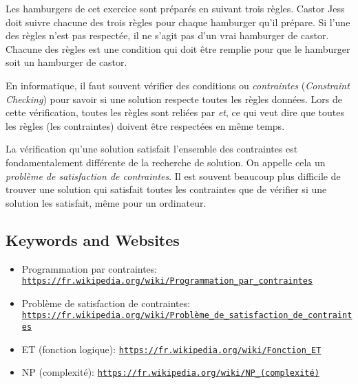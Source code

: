 \documentclass[a4paper,11pt]{report}
\newcommand{\BrochureUrlText}[1]{\texttt{#1}}
\begin{document}
Les hamburgers de cet exercice sont préparés en suivant trois règles. Castor Jess doit suivre chacune des trois règles pour chaque hamburger qu’il prépare. Si l’une des règles n’est pas respectée, il ne s’agit pas d’un vrai hamburger de castor. Chacune des règles est une condition qui doit être remplie pour que le hamburger soit un hamburger de castor.

En informatique, il faut souvent vérifier des conditions ou \emph{contraintes} (\emph{Constraint Checking}) pour savoir si une solution respecte toutes les règles données. Lors de cette vérification, toutes les règles sont reliées par \emph{et}, ce qui veut dire que toutes les règles (les contraintes) doivent être respectées en même temps.

La vérification qu’une solution satisfait l’ensemble des contraintes est fondamentalement différente de la recherche de solution. On appelle cela un \emph{problème de satisfaction de contraintes}. Il est souvent beaucoup plus difficile de trouver une solution qui satisfait toutes les contraintes que de vérifier si une solution les satisfait, même pour un ordinateur.

{\raggedright

\subsection*{Keywords and Websites}

\begin{itemize}
  \item Programmation par contraintes: \href{https://fr.wikipedia.org/wiki/Programmation_par_contraintes}{\BrochureUrlText{https://fr.wikipedia.org/wiki/Programmation\_par\_contraintes}}
  \item Problème de satisfaction de contraintes: \href{https://fr.wikipedia.org/wiki/Probl\%C3\%A8me_de_satisfaction_de_contraintes}{\BrochureUrlText{https://fr.wikipedia.org/wiki/Problème\_de\_satisfaction\_de\_contraintes}}
  \item ET (fonction logique): \href{https://fr.wikipedia.org/wiki/Fonction_ET}{\BrochureUrlText{https://fr.wikipedia.org/wiki/Fonction\_ET}}
  \item NP (complexité): \href{https://fr.wikipedia.org/wiki/NP_(complexit\%C3\%A9)}{\BrochureUrlText{https://fr.wikipedia.org/wiki/NP\_(complexité)}}
\end{itemize}


}
\end{document}
